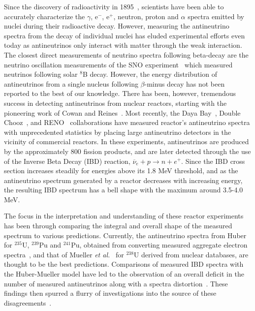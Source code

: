 \documentclass[twocolumn,amsmath,amssymb,10pt,superscriptaddress,a4paper,letterpaper,fleqn]{revtex4-1}
\begin{document}
Since the discovery of radioactivity in 1895~\cite{becquerel96}, scientists have been able to accurately characterize 
the $\gamma$, e$^-$, e$^+$, neutron, proton and $\alpha$  spectra emitted by nuclei during their radioactive decay.  
However, measuring the antineutrino spectra from the decay of individual nuclei has eluded experimental efforts even today as antineutrinos only interact with matter through the weak interaction.
The closest direct measurements of neutrino spectra following beta-decay are the  neutrino oscillation measurements of the SNO experiment~\cite{sno} which measured neutrinos following solar $^{8}$B decay. 
However, the energy distribution of antineutrinos from a single nucleus following $\beta$-minus decay has not been reported to the best of our knowledge. 
There has been, however, tremendous success in detecting antineutrinos from nuclear reactors, starting with the pioneering work of Cowan and Reines~\cite{cowan56}.  
Most recently, the Daya Bay~\cite{dayabay16}, Double Chooz~\cite{doublechooz}, and RENO~\cite{reno16} 
collaborations have measured reactor's antineutrino spectra with unprecedented statistics by placing large antineutrino detectors in the vicinity of commercial reactors.  
In these experiments, antineutrinos are produced  by the approximately 800 fission products,
and are later detected  through the use of the Inverse Beta Decay (IBD) reaction, $\overline{\nu}_e+p \rightarrow n+e^+$.  Since the IBD cross section increases steadily for
energies above its 1.8 MeV threshold, and as the antineutrino spectrum generated by a reactor decreases with increasing energy, the resulting IBD  spectrum has
a bell shape with the maximum around 3.5-4.0 MeV.


The focus in the interpretation and understanding of these  reactor experiments has been through comparing the integral and overall shape of the measured spectrum to various predictions.   
Currently, the antineutrino spectra from 
Huber~\cite{huber11} for  $^{235}$U,   $^{239}$Pu and  $^{241}$Pu, obtained from converting measured aggregate electron spectra~\cite{ill82,ill85,ill89},
and that of Mueller {\it et al.}~\cite{mueller11} for $^{238}$U derived from nuclear databases, are thought to be the best predictions.
Comparisons of measured IBD spectra with the Huber-Mueller model have led to the observation of an overall deficit in the number of measured antineutrinos along with a spectra distortion~\cite{mention11}.  These findings then spurred a flurry of investigations into the source of these disagreements~\cite{hayes14,hayes15,huber17,dayabay17,sonzogni17,mention17}. 
\end{document}
